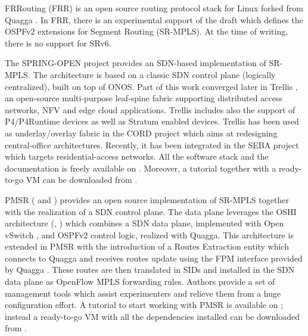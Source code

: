 FRRouting (FRR) \cite{frr} is an open source routing protocol stack for Linux forked from Quagga \cite{quagga}. In FRR, there is an experimental support \cite{frr-sr} of the draft \cite{ietf-ospf-segment-routing-extensions} which defines the OSPFv2 extensions for Segment Routing (SR-MPLS). At the time of writing, there is no support for SRv6.

The SPRING-OPEN project \cite{springopen} provides an SDN-based implementation of SR-MPLS. The architecture is based on a classic SDN control plane (logically centralized), built on top of ONOS. Part of this work converged later in Trellis \cite{trellis}, an open-source multi-purpose leaf-spine fabric supporting distributed access networks, NFV and edge cloud applications. Trellis includes also the support of P4/P4Runtime \cite{p4} \cite{p4runtime} devices as well as Stratum \cite{stratum} enabled devices. Trellis has been used as underlay/overlay fabric in the CORD project \cite{cord} which aims at redesigning central-office architectures. Recently, it has been integrated in the SEBA project \cite{SEBA} which targets residential-access networks. All the software stack and the documentation is freely available on \cite{trellis-doc}. Moreover, a tutorial together with a ready-to-go VM can be downloaded from \cite{trellis-tutorial}.

PMSR (\cite{pmsr} and \cite{trafficpmsr}) provides an open source implementation of SR-MPLS together with the realization of a SDN control plane. The data plane leverages the OSHI architecture (\cite{oshi1}, \cite{oshi2}) which combines a SDN data plane, implemented with Open vSwitch \cite{ovs}, and OSPFv2 control logic, realized with Quagga. This architecture is extended in PMSR with the introduction of a Routes Extraction entity which connects to Quagga and receives routes update using the FPM interface provided by Quagga \cite{quagga}. These routes are then translated in SIDs and installed in the SDN data plane as OpenFlow MPLS forwarding rules. Authors provide a set of management tools \cite{mantoo} which assist experimenters and relieve them from a huge configuration effort. A tutorial to start working with PMSR is available on \cite{pmsr-tutorial}; instead a ready-to-go VM with all the dependencies installed can be downloaded from \cite{oshi-home}.

